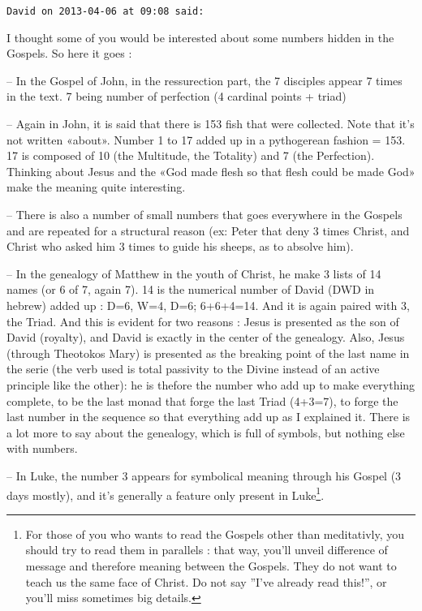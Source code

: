 \begin{footnotesize}
\begin{sffamily}
\texttt{David on 2013-04-06 at 09:08 said:}

I thought some of you would be interested about some numbers hidden in the Gospels. So here it goes :

-- In the Gospel of John, in the ressurection part, the 7 disciples appear 7 times in the text. 7 being number of perfection (4 cardinal points + triad)

-- Again in John, it is said that there is 153 fish that were collected. Note that it's not written «about». Number 1 to 17 added up in a pythogerean fashion = 153. 17 is composed of 10 (the Multitude, the Totality) and 7 (the Perfection). Thinking about Jesus and the «God made flesh so that flesh could be made God» make the meaning quite interesting.

-- There is also a number of small numbers that goes everywhere in the Gospels and are repeated for a structural reason (ex: Peter that deny 3 times Christ, and Christ who asked him 3 times to guide his sheeps, as to absolve him).

-- In the genealogy of Matthew in the youth of Christ, he make 3 lists of 14 names (or 6 of 7, again 7). 14 is the numerical number of David (DWD in hebrew) added up : D=6, W=4, D=6; 6+6+4=14. And it is again paired with 3, the Triad. And this is evident for two reasons : Jesus is presented as the son of David (royalty), and David is exactly in the center of the genealogy. Also, Jesus (through Theotokos Mary) is presented as the breaking point of the last name in the serie (the verb used is total passivity to the Divine instead of an active principle like the other): he is thefore the number who add up to make everything complete, to be the last monad that forge the last Triad (4+3=7), to forge the last number in the sequence so that everything add up as I explained it. There is a lot more to say about the genealogy, which is full of symbols, but nothing else with numbers.

-- In Luke, the number 3 appears for symbolical meaning through his Gospel (3 days mostly), and it's generally a feature only present in Luke\footnote{For those of you who wants to read the Gospels other than meditativly, you should try to read them in parallels : that way, you'll unveil difference of message and therefore meaning between the Gospels. They do not want to teach us the same face of Christ. Do not say ''I've already read this!'', or you'll miss sometimes big details.}.


\end{sffamily}
\end{footnotesize}
